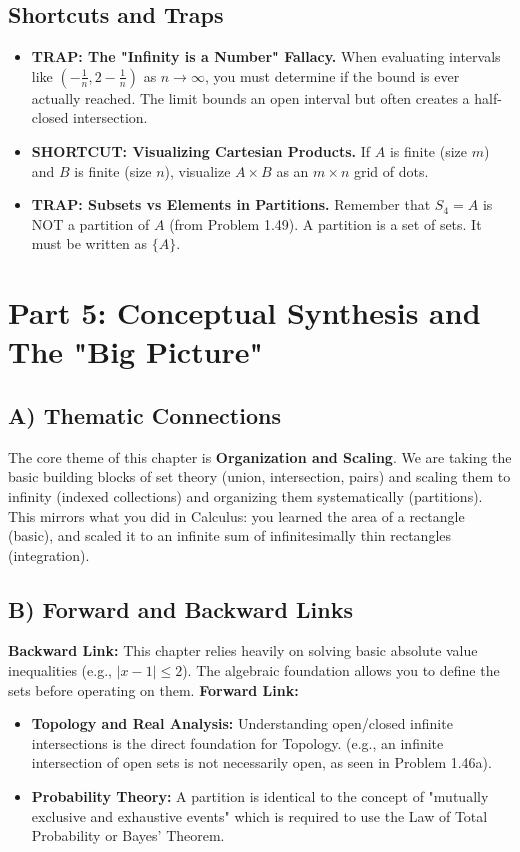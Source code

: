 \documentclass[12pt]{article}
\begin{document}
\subsection{Shortcuts and Traps}
\begin{itemize}
    \item \textbf{TRAP: The "Infinity is a Number" Fallacy.} When evaluating intervals like $(-\frac{1}{n}, 2-\frac{1}{n})$ as $n \to \infty$, you must determine if the bound is ever actually reached. The limit bounds an open interval but often creates a half-closed intersection.
    \item \textbf{SHORTCUT: Visualizing Cartesian Products.} If $A$ is finite (size $m$) and $B$ is finite (size $n$), visualize $A \times B$ as an $m \times n$ grid of dots.
    \item \textbf{TRAP: Subsets vs Elements in Partitions.} Remember that $S_4 = A$ is NOT a partition of $A$ (from Problem 1.49). A partition is a set of sets. It must be written as $\{A\}$.
\end{itemize}

\newpage
\section{Part 5: Conceptual Synthesis and The "Big Picture"}

\subsection{A) Thematic Connections}
The core theme of this chapter is \textbf{Organization and Scaling}. We are taking the basic building blocks of set theory (union, intersection, pairs) and scaling them to infinity (indexed collections) and organizing them systematically (partitions). 
This mirrors what you did in Calculus: you learned the area of a rectangle (basic), and scaled it to an infinite sum of infinitesimally thin rectangles (integration).

\subsection{B) Forward and Backward Links}
\textbf{Backward Link:} This chapter relies heavily on solving basic absolute value inequalities (e.g., $|x-1| \le 2$). The algebraic foundation allows you to define the sets before operating on them.
\textbf{Forward Link:} 
\begin{itemize}
    \item \textbf{Topology and Real Analysis:} Understanding open/closed infinite intersections is the direct foundation for Topology. (e.g., an infinite intersection of open sets is not necessarily open, as seen in Problem 1.46a).
    \item \textbf{Probability Theory:} A partition is identical to the concept of "mutually exclusive and exhaustive events" which is required to use the Law of Total Probability or Bayes' Theorem.
\end{itemize}
\end{document}

